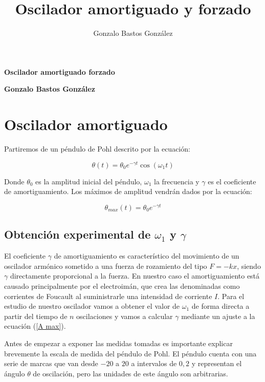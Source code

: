 \documentclass[a4paper,12pt,titlepage]{article}
\title{Oscilador amortiguado y forzado}
\author{Gonzalo Bastos González}
\begin{document}
\begin{center}
    \textbf{\Large Oscilador amortiguado forzado}
\end{center}

\begin{center}
    \textbf{Gonzalo Bastos González}
\end{center}

\section{Oscilador amortiguado}

Partiremos de un péndulo de Pohl descrito por la ecuación:

\begin{equation}
    \theta(t) = \theta_0 e^{-\gamma t} \cos (\omega_1t)
    \label{thetaT}
\end{equation}

Donde $\theta_0$ es la amplitud inicial del péndulo, $\omega_1$ la frecuencia y $\gamma$ es el coeficiente de amortiguamiento. Los máximos de amplitud vendrán dados por la ecuación:

\begin{equation}
    \theta_{max}(t) = \theta_0 e^{-\gamma t}
    \label{A max}
\end{equation}

\subsection{Obtención experimental de $\omega_1$ y $\gamma$}

El coeficiente $\gamma$ de amortiguamiento es característico del movimiento de un oscilador armónico sometido a una fuerza de rozamiento del tipo $F=-kx$, siendo $\gamma$ directamente proporcional a la fuerza. En nuestro caso el amortiguamiento está causado principalmente por el electroimán, que crea las denominadas como corrientes de Foucault al suministrarle una intensidad de corriente $I$. Para el estudio de nuestro oscilador vamos a obtener el valor de $\omega_1$ de forma directa a partir del tiempo de $n$ oscilaciones y vamos a calcular $\gamma$ mediante un ajuste a la ecuación (\ref{A max}).

\par Antes de empezar a exponer las medidas tomadas es importante explicar brevemente la escala de medida del péndulo de Pohl. El péndulo cuenta con una serie de marcas que van desde $-20$ a $20$ a intervalos de $0,2$ y representan el ángulo $\theta$ de oscilación, pero las unidades de este ángulo son arbitrarias.
\end{document}
